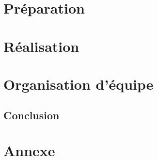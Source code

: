 \documentclass[a4paper, 11pt, oneside, oldfontcommands]{memoir}
\newcounter{rem}[chapter]
\begin{document}
% 
% 
% 
% 
% 

%
%


\part{Préparation}





\part{Réalisation}






\part{Organisation d'équipe}






\chapter*{Conclusion}
\newpage




\part*{Annexe}
\appendix
\nocite{*}
%
%
%









\newpage
 \listoffigures
 \printindex
 
  
\end{document}
